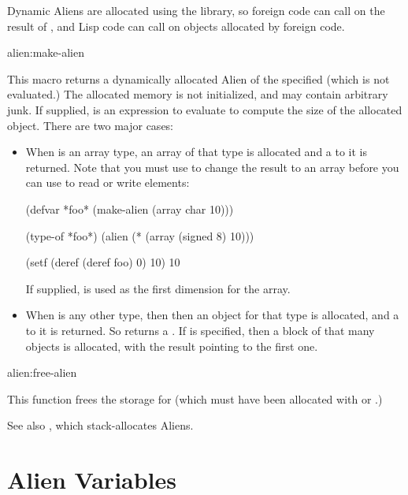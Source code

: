 Dynamic Aliens are allocated using the  library, so foreign code
can call  on the result of , and Lisp code can
call  on objects allocated by foreign code.

\begin{defmac}{alien:}{make-alien}{ }
  
  This macro returns a dynamically allocated Alien of the specified
   (which is not evaluated.)  The allocated memory is not
  initialized, and may contain arbitrary junk.  If supplied,
   is an expression to evaluate to compute the size of the
  allocated object.  There are two major cases:
  \begin{itemize}
  \item When  is an array type, an array of that type is
    allocated and a  to it is returned.  Note that you
    must use  to change the result to an array before you
    can use  to read or write elements:

\begin{lisp}
(defvar *foo* (make-alien (array char 10)))

(type-of *foo*) \result{} (alien (* (array (signed 8) 10)))

(setf (deref (deref foo) 0) 10) \result{} 10
\end{lisp}

    If supplied,  is used as the first dimension for the
    array.
    
  \item When  is any other type, then then an object for
    that type is allocated, and a  to it is returned.  So
     returns a .  If 
    is specified, then a block of that many objects is allocated, with
    the result pointing to the first one.
  \end{itemize}
\end{defmac}
 
\begin{defun}{alien:}{free-alien}{}

  This function frees the storage for  (which must have
  been allocated with  or .)
\end{defun}

See also , which stack-allocates Aliens.


\section{Alien Variables}

